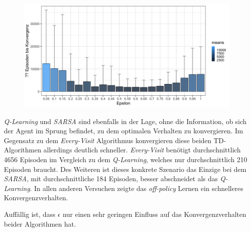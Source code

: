 \begin{figure}[H]
  \centering
  \includegraphics[width=\textwidth]{images/SimpleNoJumpEveryVisitMCA}
  \label{fig:test1}
\end{figure}
 
\textit{Q-Learning} und \textit{SARSA} sind ebenfalls in der Lage, ohne die Information, ob sich der Agent im Sprung befindet, zu dem optimalen Verhalten zu konvergieren. Im Gegensatz zu dem \textit{Every-Visit} Algorithmus konvergieren diese beiden TD-Algorithmen allerdings deutlich schneller. \textit{Every-Visit} benötigt durchschnittlich 4656 Episoden im Vergleich zu dem \textit{Q-Learning}, welches nur durchschnittlich 210 Episoden braucht. Des Weiteren ist dieses konkrete Szenario das Einzige bei dem \textit{SARSA}, mit durchschnittliche 184 Episoden, besser abschneidet als das \textit{Q-Learning}. In allen anderen Versuchen zeigte das \textit{off-policy} Lernen ein schnelleres Konvergenzverhalten.
\par 
Auffällig ist, dass $\epsilon$ nur einen sehr geringen Einfluss auf das Konvergenzverhalten beider Algorithmen hat. 

